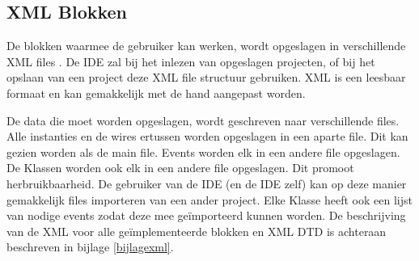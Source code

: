 \documentclass[]{article}
\begin{document}
\subsection{XML Blokken}
\label{XML}
De blokken waarmee de gebruiker kan werken, wordt opgeslagen in verschillende XML files \cite{xmlresource}. De IDE zal bij het inlezen van opgeslagen projecten, of bij het opslaan van een project deze XML file structuur gebruiken. XML is een leesbaar formaat en kan gemakkelijk met de hand aangepast worden.

De data die moet worden opgeslagen, wordt geschreven naar verschillende files. Alle instanties en de wires ertussen worden opgeslagen in een aparte file. Dit kan gezien worden als de main file. Events worden elk in een andere file opgeslagen. De Klassen worden ook elk in een andere file opgeslagen. Dit promoot herbruikbaarheid. De gebruiker van de IDE (en de IDE zelf) kan op deze manier gemakkelijk files importeren van een ander project. Elke Klasse heeft ook een lijst van nodige events zodat deze mee ge\"{i}mporteerd kunnen worden. De beschrijving van de XML voor alle ge\"{i}mplementeerde blokken en XML DTD is achteraan beschreven in bijlage \ref{bijlagexml}.
\end{document}
